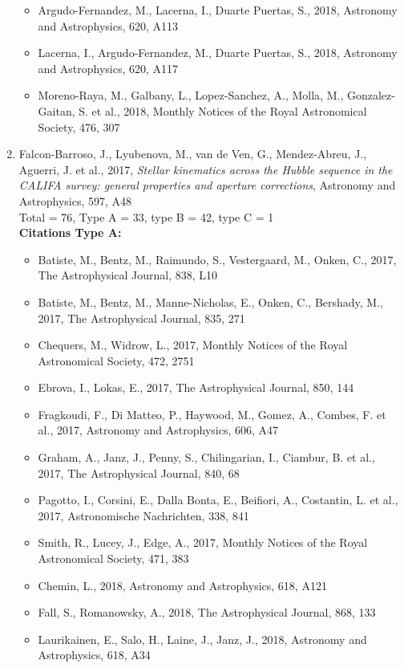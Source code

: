 \documentclass{letter}
\begin{document}
\begin{enumerate}
\begin{itemize}
\item Argudo-Fernandez, M., Lacerna, I., Duarte Puertas, S., 2018, Astronomy and Astrophysics, 620, A113
\item Lacerna, I., Argudo-Fernandez, M., Duarte Puertas, S., 2018, Astronomy and Astrophysics, 620, A117
\item Moreno-Raya, M., Galbany, L., Lopez-Sanchez, A., Molla, M., Gonzalez-Gaitan, S. et al., 2018, Monthly Notices of the Royal Astronomical Society, 476, 307
\end{itemize}
\item Falcon-Barroso, J., Lyubenova, M., van de Ven, G., Mendez-Abreu, J., Aguerri, J. et al., 2017, {\it Stellar kinematics across the Hubble sequence in the CALIFA survey: general properties and aperture corrections}, Astronomy and Astrophysics, 597, A48 \\ 
Total = 76, Type A = 33, type B = 42, type C = 1 \\ 
{\bf Citations Type A:}
\begin{itemize}
\item Batiste, M., Bentz, M., Raimundo, S., Vestergaard, M., Onken, C., 2017, The Astrophysical Journal, 838, L10
\item Batiste, M., Bentz, M., Manne-Nicholas, E., Onken, C., Bershady, M., 2017, The Astrophysical Journal, 835, 271
\item Chequers, M., Widrow, L., 2017, Monthly Notices of the Royal Astronomical Society, 472, 2751
\item Ebrova, I., Lokas, E., 2017, The Astrophysical Journal, 850, 144
\item Fragkoudi, F., Di Matteo, P., Haywood, M., Gomez, A., Combes, F. et al., 2017, Astronomy and Astrophysics, 606, A47
\item Graham, A., Janz, J., Penny, S., Chilingarian, I., Ciambur, B. et al., 2017, The Astrophysical Journal, 840, 68
\item Pagotto, I., Corsini, E., Dalla Bonta, E., Beifiori, A., Costantin, L. et al., 2017, Astronomische Nachrichten, 338, 841
\item Smith, R., Lucey, J., Edge, A., 2017, Monthly Notices of the Royal Astronomical Society, 471, 383
\item Chemin, L., 2018, Astronomy and Astrophysics, 618, A121
\item Fall, S., Romanowsky, A., 2018, The Astrophysical Journal, 868, 133
\item Laurikainen, E., Salo, H., Laine, J., Janz, J., 2018, Astronomy and Astrophysics, 618, A34

\end{itemize}
\end{enumerate}
\end{document}
